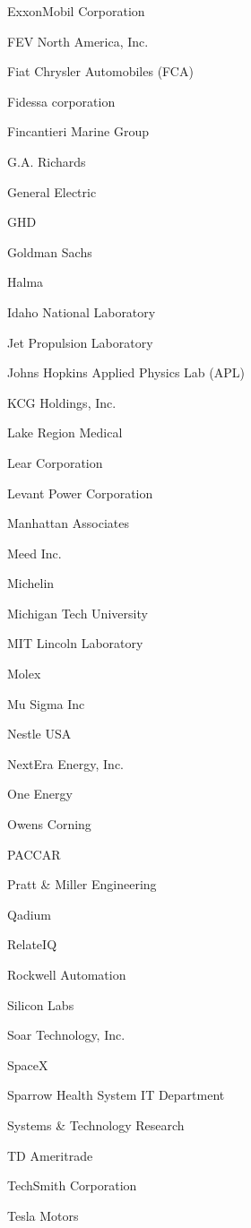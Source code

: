 \documentclass[twoside]{article}
\begin{document}
\begin{center}
\begin{multicols}{5}
\begin{FlushLeft}
\begin{compactitem}
\item ExxonMobil Corporation
\item FEV North America, Inc.
\item Fiat Chrysler Automobiles (FCA)
\item Fidessa corporation
\item Fincantieri Marine Group
\item G.A. Richards
\item General Electric
\item GHD
\item Goldman Sachs
\item Halma
\item Idaho National Laboratory
\item Jet Propulsion Laboratory
\item Johns Hopkins Applied Physics Lab (APL)
\item KCG Holdings, Inc.
\item Lake Region Medical
\item Lear Corporation
\item Levant Power Corporation
\item Manhattan Associates
\item Meed Inc.
\item Michelin
\item Michigan Tech University
\item MIT Lincoln Laboratory
\item Molex
\item Mu Sigma Inc
\item Nestle USA
\item NextEra Energy, Inc.
\item One Energy
\item Owens Corning
\item PACCAR
\item Pratt \& Miller Engineering
\item Qadium
\item RelateIQ
\item Rockwell Automation
\item Silicon Labs
\item Soar Technology, Inc.
\item SpaceX
\item Sparrow Health System IT Department
\item Systems \& Technology Research
\item TD Ameritrade
\item TechSmith Corporation
\item Tesla Motors

\end{compactitem}
\end{FlushLeft}
\end{multicols}
\end{center}
\end{document}
